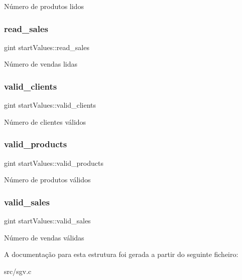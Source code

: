 Número de produtos lidos \mbox{\label{structstartValues_a407924d22b3d5f4cdd94b8e8b0d3edd3}} 
\subsubsection{\texorpdfstring{read\+\_\+sales}{read\_sales}}
{\footnotesize\ttfamily gint start\+Values\+::read\+\_\+sales}

Número de vendas lidas \mbox{\label{structstartValues_aaa0344a5400c6c8143eb52e3b31bf337}} 
\subsubsection{\texorpdfstring{valid\+\_\+clients}{valid\_clients}}
{\footnotesize\ttfamily gint start\+Values\+::valid\+\_\+clients}

Número de clientes válidos \mbox{\label{structstartValues_a5ff53c4c14ef84d2e7c8e399fc17cf4c}} 
\subsubsection{\texorpdfstring{valid\+\_\+products}{valid\_products}}
{\footnotesize\ttfamily gint start\+Values\+::valid\+\_\+products}

Número de produtos válidos \mbox{\label{structstartValues_a5f9fab3890b3551496940dda2b6f9154}} 
\subsubsection{\texorpdfstring{valid\+\_\+sales}{valid\_sales}}
{\footnotesize\ttfamily gint start\+Values\+::valid\+\_\+sales}

Número de vendas válidas 

A documentação para esta estrutura foi gerada a partir do seguinte ficheiro\+:\begin{DoxyCompactItemize}
\item 
src/sgv.\+c\end{DoxyCompactItemize}
